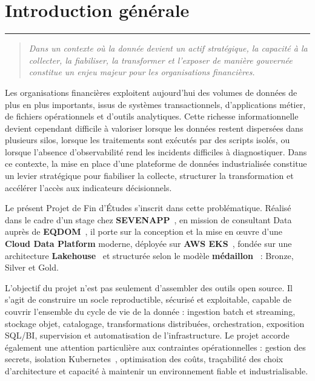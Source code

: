 \chapter*{Introduction générale}

\begin{center}
{\color{softline}\rule{0.48\textwidth}{0.8pt}}
\end{center}

\vspace{0.2cm}

\begingroup
\setlength{\parindent}{0pt}
\setlength{\parskip}{0.72em}

\begin{quote}
\itshape
Dans un contexte où la donnée devient un actif stratégique, la capacité à la collecter, la fiabiliser, la transformer et l'exposer de manière gouvernée constitue un enjeu majeur pour les organisations financières.
\end{quote}

\vspace{0.1cm}

Les organisations financières exploitent aujourd'hui des volumes de données de plus en plus importants, issus de systèmes transactionnels, d'applications métier, de fichiers opérationnels et d'outils analytiques. Cette richesse informationnelle devient cependant difficile à valoriser lorsque les données restent dispersées dans plusieurs silos, lorsque les traitements sont exécutés par des scripts isolés, ou lorsque l'absence d'observabilité rend les incidents difficiles à diagnostiquer. Dans ce contexte, la mise en place d'une plateforme de données industrialisée constitue un levier stratégique pour fiabiliser la collecte, structurer la transformation et accélérer l'accès aux indicateurs décisionnels.

Le présent Projet de Fin d'Études s'inscrit dans cette problématique. Réalisé dans le cadre d'un stage chez \textbf{SEVENAPP}~\cite{sevenapp}, en mission de consultant Data auprès de \textbf{EQDOM}~\cite{eqdom}, il porte sur la conception et la mise en œuvre d'une \textbf{Cloud Data Platform} moderne, déployée sur \textbf{AWS EKS}~\cite{aws-eks}, fondée sur une architecture \textbf{Lakehouse}~\cite{lakehouse-paper} et structurée selon le modèle \textbf{médaillon}~\cite{databricks-medallion} : Bronze, Silver et Gold.

L'objectif du projet n'est pas seulement d'assembler des outils open source. Il s'agit de construire un socle reproductible, sécurisé et exploitable, capable de couvrir l'ensemble du cycle de vie de la donnée : ingestion batch et streaming, stockage objet, catalogage, transformations distribuées, orchestration, exposition SQL/BI, supervision et automatisation de l'infrastructure. Le projet accorde également une attention particulière aux contraintes opérationnelles : gestion des secrets, isolation Kubernetes~\cite{kubernetes}, optimisation des coûts, traçabilité des choix d'architecture et capacité à maintenir un environnement fiable et industrialisable.

